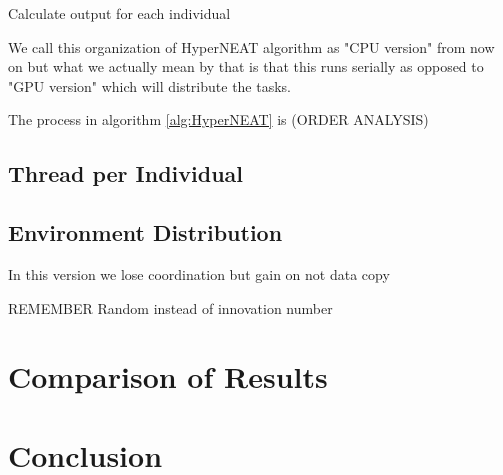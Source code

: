 \documentclass[twocolumn]{article}
\begin{document}
\begin{algorithm}
    \caption{Calculate output for each individual}
    \label{alg:Individual}
    \begin{algorithmic}[1]
                    \EndIf
                \EndFor
            \EndFor
            \EndFor
            \EndFor
            \State {}
        \EndProcedure
                \State {}
            \EndIf
            \EndFor
            \State {}
        \EndProcedure
    \end{algorithmic}
\end{algorithm}

We call this organization of HyperNEAT algorithm as "CPU version" from now on but what we actually mean by that is that this runs serially as opposed to "GPU version" which will distribute the tasks.

The process in algorithm \ref{alg:HyperNEAT} is (ORDER ANALYSIS)

\subsection{Thread per Individual}

\subsection{Environment Distribution}
In this version we lose coordination but gain on not data copy

REMEMBER
Random instead of innovation number


\section{Comparison of Results}


\section{Conclusion}




\end{document}
